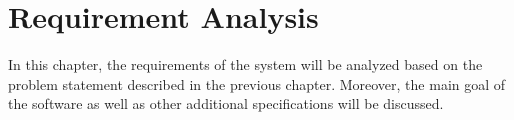 \chapter{Requirement Analysis}
  \label{analysis}

In this chapter, the requirements of the system will be analyzed based on the problem statement described in the previous chapter. Moreover, the main goal of the software as well as other additional specifications will be discussed. 




